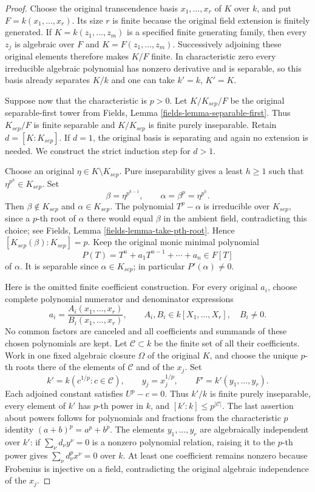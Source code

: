\begin{proof}
Choose the original transcendence basis
$x_1,\ldots,x_r$ of $K$ over $k$, and put
$F=k(x_1,\ldots,x_r)$. Its size $r$ is finite
because the original field extension is finitely
generated. If $K=k(z_1,\ldots,z_m)$ is a specified
finite generating family, then every $z_j$ is
algebraic over $F$ and $K=F(z_1,\ldots,z_m)$.
Successively adjoining these original elements
therefore makes $K/F$ finite. In characteristic
zero every irreducible algebraic polynomial has
nonzero derivative and is separable, so this
basis already separates $K/k$ and one can take
$k'=k$, $K'=K$.

Suppose now that the characteristic is $p>0$.
Let $K/K_{sep}/F$ be the original separable-first
tower from Fields, Lemma \ref{fields-lemma-separable-first}.
Thus $K_{sep}/F$ is finite separable and
$K/K_{sep}$ is finite purely inseparable. Retain
$d=[K:K_{sep}]$. If $d=1$, the original basis
is separating and again no extension is needed.
We construct the strict induction step for $d>1$.

Choose an original $\eta\in K\setminus K_{sep}$.
Pure inseparability gives a least $h\geq1$
such that $\eta^{p^h}\in K_{sep}$. Set
$$
\beta=\eta^{p^{h-1}},\qquad
\alpha=\beta^p=\eta^{p^h}.
$$
Then $\beta\notin K_{sep}$ and
$\alpha\in K_{sep}$. The polynomial $T^p-\alpha$
is irreducible over $K_{sep}$, since a $p$-th
root of $\alpha$ there would equal $\beta$
in the ambient field, contradicting this choice;
see Fields, Lemma \ref{fields-lemma-take-pth-root}.
Hence $[K_{sep}(\beta):K_{sep}]=p$.
Keep the original monic minimal polynomial
$$
P(T)=T^n+a_1T^{n-1}+\cdots+a_n\in F[T]
$$
of $\alpha$. It is separable since
$\alpha\in K_{sep}$; in particular $P'(\alpha)\ne0$.

Here is the omitted finite coefficient construction.
For every original $a_i$, choose complete polynomial
numerator and denominator expressions
$$
a_i=\frac{A_i(x_1,\ldots,x_r)}{B_i(x_1,\ldots,x_r)},
\qquad A_i,B_i\in k[X_1,\ldots,X_r],\quad B_i\ne0.
$$
No common factors are canceled and all coefficients
and summands of these chosen polynomials are kept.
Let $\mathcal C\subset k$ be the finite set of
all their coefficients. Work in one fixed
algebraic closure $\Omega$ of the original $K$,
and choose the unique $p$-th roots there of
the elements of $\mathcal C$ and of the $x_j$.
Set
$$
k'=k(c^{1/p}:c\in\mathcal C),\qquad
y_j=x_j^{1/p},\qquad
F'=k'(y_1,\ldots,y_r).
$$
Each adjoined constant satisfies $U^p-c=0$.
Thus $k'/k$ is finite purely inseparable,
every element of $k'$ has $p$-th power in $k$,
and $[k':k]\leq p^{|\mathcal C|}$.
The last assertion about powers follows for
polynomials and fractions from the characteristic
$p$ identity $(a+b)^p=a^p+b^p$.
The elements $y_1,\ldots,y_r$ are algebraically
independent over $k'$: if
$\sum_\nu d_\nu y^\nu=0$ is a nonzero polynomial
relation, raising it to the $p$-th power gives
$\sum_\nu d_\nu^p x^\nu=0$ over $k$.
At least one coefficient remains nonzero because
Frobenius is injective on a field, contradicting
the original algebraic independence of the $x_j$.


\end{proof}
